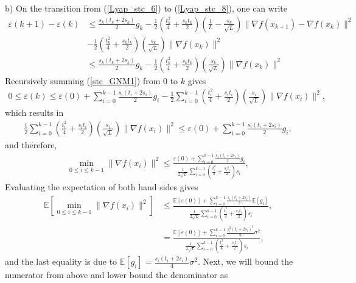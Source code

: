 \documentclass{article}
\theoremstyle{plain}
\theoremstyle{definition}
\theoremstyle{remark}
\begin{document}
b) On the transition from (\ref{Lyap_stc_6}) to (\ref{Lyap_stc_8}), one can write
\begin{align}\label{stc_GNM1}
    \varepsilon(k+1)-\varepsilon(k)&\leq \frac{s_k(t_k+2s_k)}{2}g_k-\frac{1}{2}\left( \frac{t_k^2}{4}+\frac{s_kt_k}{2} \right)(\frac{1}{L}-\frac{s_k}{\sqrt{L}})\|\nabla f(x_{k+1})-\nabla f(x_k)\|^2\nonumber\\
    &-\frac{1}{2}\left(\frac{t_k^2}{4}+\frac{s_kt_k}{2}\right)(\frac{s_k}{\sqrt{L}})\|\nabla f(x_k)\|^2\nonumber\\
    &\leq \frac{s_k(t_k+2s_k)}{2}g_k-\frac{1}{2}\left(\frac{t_k^2}{4}+\frac{s_kt_k}{2}\right)(\frac{s_k}{\sqrt{L}})\|\nabla f(x_k)\|^2
\end{align}
Recursively summing (\ref{stc_GNM1}) from $0$ to $k$ gives
\begin{align}\label{stc_GNM2}
    0\leq\varepsilon(k)\leq \varepsilon(0)+ \sum_{i=0}^{k-1} \frac{s_i(t_i+2s_i)}{2}g_i -\frac{1}{2}\sum_{i=0}^{k-1}\left(\frac{t_i^2}{4}+\frac{s_it_i}{2}\right)(\frac{s_i}{\sqrt{L}})\|\nabla f(x_i)\|^2,
\end{align}
which results in
\begin{align}\label{stc_GNM3}
    \frac{1}{2}\sum_{i=0}^{k-1}\left(\frac{t_i^2}{4}+\frac{s_it_i}{2}\right)(\frac{s_i}{\sqrt{L}})\|\nabla f(x_i)\|^2\leq \varepsilon(0)+ \sum_{i=0}^{k-1} \frac{s_i(t_i+2s_i)}{2}g_i,
\end{align}
and therefore,
\begin{align}\label{stc_GNM4}
    \min_{0\leq i\leq k-1}\|\nabla f(x_i)\|^2 \leq \frac{\varepsilon(0)+ \sum_{i=0}^{k-1} \frac{s_i(t_i+2s_i)}{2}g_i}{\frac{1}{2\sqrt{L}}\sum_{i=0}^{k-1}\left(\frac{t_i^2}{4}+\frac{s_it_i}{2}\right)s_i},
\end{align}
Evaluating the expectation of both hand sides gives
\begin{align}\label{stc_GNM4}
    \mathbb E\left[\min_{0\leq i\leq k-1}\|\nabla f(x_i)\|^2 \right]&\leq \frac{\mathbb E\left[\varepsilon(0)\right]+ \sum_{i=0}^{k-1} \frac{s_i(t_i+2s_i)}{2}\mathbb E\left[g_i\right]}{\frac{1}{2\sqrt{L}}\sum_{i=0}^{k-1}\left(\frac{t_i^2}{4}+\frac{s_it_i}{2}\right)s_i},\nonumber\\
    &= \frac{\mathbb E\left[\varepsilon(0)\right]+ \sum_{i=0}^{k-1} \frac{s_i^2(t_i+2s_i)^2}{8}\sigma^2}{\frac{1}{2\sqrt{L}}\sum_{i=0}^{k-1}\left(\frac{t_i^2}{4}+\frac{s_it_i}{2}\right)s_i},
\end{align}
and the last equality is due to $\mathbb E[g_i]= \frac{s_i(t_i+2s_i)}{4}\sigma^2$. Next, we will bound the numerator from above and lower bound the denominator as 
\end{document}
